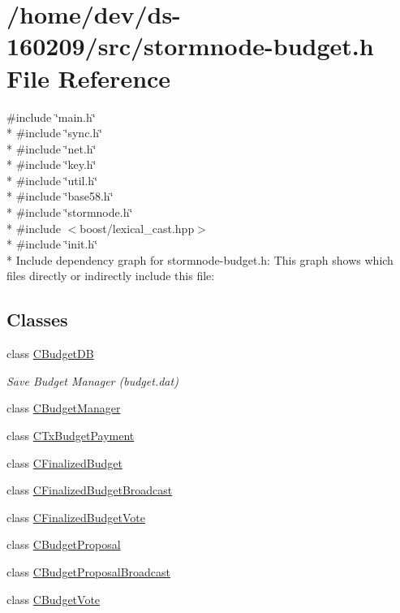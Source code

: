 \hypertarget{stormnode-budget_8h}{}\section{/home/dev/ds-\/160209/src/stormnode-\/budget.h File Reference}
\label{stormnode-budget_8h}
{\ttfamily \#include \char`\"{}main.\+h\char`\"{}}\\*
{\ttfamily \#include \char`\"{}sync.\+h\char`\"{}}\\*
{\ttfamily \#include \char`\"{}net.\+h\char`\"{}}\\*
{\ttfamily \#include \char`\"{}key.\+h\char`\"{}}\\*
{\ttfamily \#include \char`\"{}util.\+h\char`\"{}}\\*
{\ttfamily \#include \char`\"{}base58.\+h\char`\"{}}\\*
{\ttfamily \#include \char`\"{}stormnode.\+h\char`\"{}}\\*
{\ttfamily \#include $<$boost/lexical\+\_\+cast.\+hpp$>$}\\*
{\ttfamily \#include \char`\"{}init.\+h\char`\"{}}\\*
Include dependency graph for stormnode-\/budget.h\+:
This graph shows which files directly or indirectly include this file\+:
\subsection*{Classes}
\begin{DoxyCompactItemize}
\item 
class \hyperlink{class_c_budget_d_b}{C\+Budget\+D\+B}
\begin{DoxyCompactList}\small\item\em Save Budget Manager (budget.\+dat) \end{DoxyCompactList}\item 
class \hyperlink{class_c_budget_manager}{C\+Budget\+Manager}
\item 
class \hyperlink{class_c_tx_budget_payment}{C\+Tx\+Budget\+Payment}
\item 
class \hyperlink{class_c_finalized_budget}{C\+Finalized\+Budget}
\item 
class \hyperlink{class_c_finalized_budget_broadcast}{C\+Finalized\+Budget\+Broadcast}
\item 
class \hyperlink{class_c_finalized_budget_vote}{C\+Finalized\+Budget\+Vote}
\item 
class \hyperlink{class_c_budget_proposal}{C\+Budget\+Proposal}
\item 
class \hyperlink{class_c_budget_proposal_broadcast}{C\+Budget\+Proposal\+Broadcast}
\item 
class \hyperlink{class_c_budget_vote}{C\+Budget\+Vote}
\end{DoxyCompactItemize}
